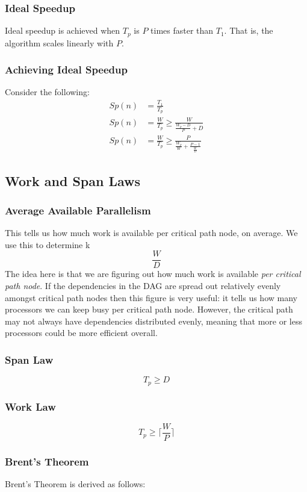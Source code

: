 \documentclass{standalone}
\begin{document}
\subsubsection{Ideal Speedup}
Ideal speedup is achieved when $T_p$ is $P$ times faster than $T_1$. That is, the algorithm scales linearly with $P$.

\subsubsection{Achieving Ideal Speedup}
Consider the following:
\begin{align*}
  Sp(n) &= \frac{T_1}{T_p}\\
  Sp(n) &= \frac{W}{T_p} \geq \frac{W}{\frac{W_p - D}{P} + D}\\
  Sp(n) &= \frac{W}{T_p} \geq \frac{P}{\frac{W_p}{W} + \frac{P - 1}{\frac{W}{D}}}
\end{align*}

\subsection{Work and Span Laws}
\subsubsection{Average Available Parallelism}
This tells us how much work is available per critical path node, on average. We
use this to determine k
\[\frac{W}{D}\]
The idea here is that we are figuring out how much work is available
\textit{per critical path node}. If the dependencies in the DAG are spread out
relatively evenly amongst critical path nodes then this figure is very useful:
it tells us how many processors we can keep busy per critical path node.
However, the critical path may not always have dependencies distributed evenly,
meaning that more or less processors could be more efficient overall.

\subsubsection{Span Law}
\[T_p \geq D\]

\subsubsection{Work Law}
\[T_p \geq \lceil \frac{W}{P} \rceil\]

\subsubsection{Brent's Theorem}
Brent's Theorem is derived as follows:
\end{document}
